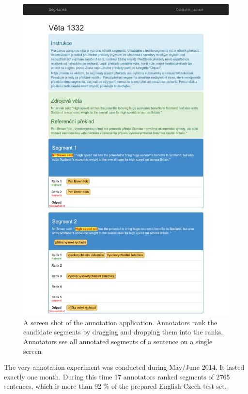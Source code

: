 \begin{figure}
    \begin{center}
        \includegraphics[width=\textwidth]{img/segranks-screenshot2.png}
    \end{center}
    \caption[A screen shot of the annotation application]{A screen shot of the
    annotation application. Annotators rank the candidate segments by dragging
and dropping them into the ranks.  Annotators see all annotated segments of a
sentence on a single screen}
    \label{segranks-screenshot}
\end{figure}

The very annotation experiment was conducted during May/June 2014. It lasted
exactly one month. During this time 17 annotators ranked segments of 2765
sentences, which is more than 92 \% of the prepared English-Czech test set.

